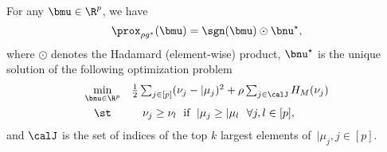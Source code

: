 \begin{namedlemma}
    [~\ref{lemma:equivalence_between_proximal_operator_and_huber_isotonic_regression}]
    For any $\bmu \in \R^p$, we have 
    $$\prox_{\rho g^*}(\bmu) = \sgn(\bmu) \odot \bnu^\star, $$ 
    where $\odot$ denotes the Hadamard (element-wise) product, $\bnu^\star$ is the unique solution of the following optimization problem
    \begin{align}
        \label{obj:KyFan_Huber_isotonic_regression}
        \begin{array}{cl}
            \min\limits_{\bnu \in \R^p} & \frac{1}{2} \sum_{j \in [p]} (\nu_j - \vert{\mu_j})^2 + \rho \sum_{j \in \calJ} H_M (\nu_j) \\[2ex]
            \st & \quad \nu_j \geq \nu_l \; \text{ if } \; \vert{\mu_j} \geq \vert{\mu_l} ~~ \forall j, l \in [p],
        \end{array} 
    \end{align}
    and $\calJ$ is the set of indices of the top $k$ largest elements of~$ \vert{\mu_j}, j \in [p]$. 
\end{namedlemma}

